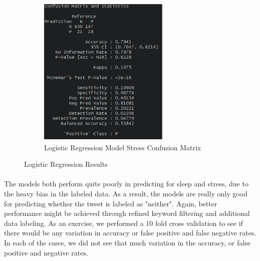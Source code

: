 \documentclass{article}
\begin{document}
\begin{figure}[H]
\begin{subfigure}[b]{0.5\linewidth}
	\includegraphics[width=\linewidth]
	{images/Linear_model_stress_cm.png}
	\caption{Logistic Regression Model Stress Confusion Matrix}
\end{subfigure}
\caption{Logistic Regression Results}
\label{fig:LR Results}
\end{figure}

\paragraph{}
The models both perform quite poorly in predicting for sleep and stress, due to the heavy bias in the labeled data.  As a result, the models are really only good for predicting whether the tweet is labeled as "neither".  Again, better performance might be achieved through refined keyword filtering and additional data labeling.  As an exercise, we performed a 10 fold cross validation to see if there would be any variation in accuracy or false positive and false negative rates.  In each of the cases, we did not see that much variation in the accuracy, or false positive and negative rates.      
\end{document}
